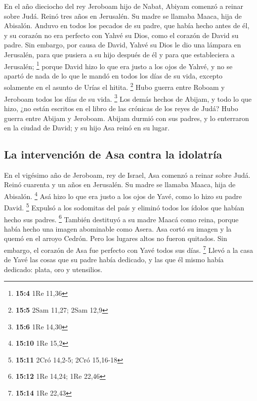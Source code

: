\begin{paracol}{2}
 En el año dieciocho del rey Jeroboam hijo de Nabat,
Abiyam comenzó a reinar sobre Judá.  Reinó tres años en
Jerusalén. Su madre se llamaba Maaca, hija de Abisalón. 
Anduvo en todos los pecados de su padre, que había hecho antes de él, y
su corazón no era perfecto con Yahvé su Dios, como el corazón de David
su padre.  Sin embargo, por causa de David, Yahvé su Dios
le dio una lámpara en Jerusalén, para que pusiera a su hijo después de
él y para que estableciera a Jerusalén; \footnote{\textbf{15:4} 1Re
  11,36}  porque David hizo lo que era justo a los ojos de
Yahvé, y no se apartó de nada de lo que le mandó en todos los días de su
vida, excepto solamente en el asunto de Urías el hitita. \footnote{\textbf{15:5}
  2Sam 11,27; 2Sam 12,9}  Hubo guerra entre Roboam y
Jeroboam todos los días de su vida. \footnote{\textbf{15:6} 1Re 14,30}
 Los demás hechos de Abijam, y todo lo que hizo, ¿no están
escritos en el libro de las crónicas de los reyes de Judá? Hubo guerra
entre Abijam y Jeroboam.  Abijam durmió con sus padres, y
lo enterraron en la ciudad de David; y su hijo Asa reinó en su lugar.

\hypertarget{la-intervenciuxf3n-de-asa-contra-la-idolatruxeda}{%
\subsection{La intervención de Asa contra la
idolatría}\label{la-intervenciuxf3n-de-asa-contra-la-idolatruxeda}}

 En el vigésimo año de Jeroboam, rey de Israel, Asa
comenzó a reinar sobre Judá.  Reinó cuarenta y un años en
Jerusalén. Su madre se llamaba Maaca, hija de Abisalón. \footnote{\textbf{15:10}
  1Re 15,2}  Asá hizo lo que era justo a los ojos de
Yavé, como lo hizo su padre David. \footnote{\textbf{15:11} 2Cró 14,2-5;
  2Cró 15,16-18}  Expulsó a los sodomitas del país y
eliminó todos los ídolos que habían hecho sus padres. \footnote{\textbf{15:12}
  1Re 14,24; 1Re 22,46}  También destituyó a su madre
Maacá como reina, porque había hecho una imagen abominable como Asera.
Asa cortó su imagen y la quemó en el arroyo Cedrón.  Pero
los lugares altos no fueron quitados. Sin embargo, el corazón de Asa fue
perfecto con Yavé todos sus días. \footnote{\textbf{15:14} 1Re 22,43}
 Llevó a la casa de Yavé las cosas que su padre había
dedicado, y las que él mismo había dedicado: plata, oro y utensilios.


\end{paracol}
